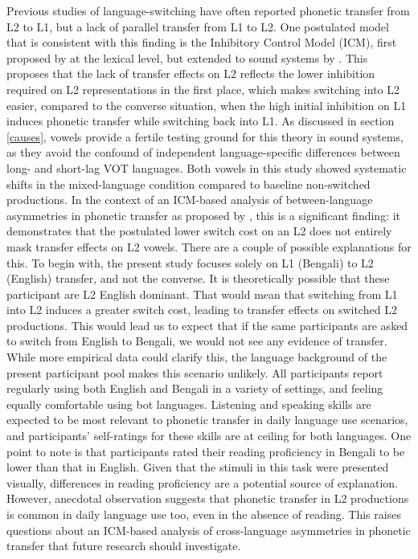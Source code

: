 \documentclass[12 pt]{article}
\begin{document}
Previous studies of language-switching have often reported phonetic transfer from L2 to L1, but a lack of parallel transfer from L1 to L2. One postulated model that is consistent with this finding is the Inhibitory Control Model (ICM), first proposed by \cite{green1986control} at the lexical level, but extended to sound systems by \cite{olson2013bilingual,tsui2019impact}. This proposes that the lack of transfer effects on L2 reflects the lower inhibition required on L2 representations in the first place, which makes switching into L2 easier, compared to the converse situation, when the high initial inhibition on L1 induces phonetic transfer while switching back into L1.  As discussed in section \ref{causes}, vowels provide a fertile testing ground for this theory in sound systems, as they avoid the confound of independent language-specific differences between long- and short-lag VOT languages. Both vowels in this study showed systematic shifts in the mixed-language condition compared to baseline non-switched productions. In the context of an ICM-based analysis of between-language asymmetries in phonetic transfer as proposed by \cite{olson2013bilingual}, this is a significant finding: it demonstrates that the postulated lower switch cost on an L2 does not entirely mask transfer effects on L2 vowels. There are a couple of possible explanations for this. To begin with, the present study focuses solely on L1 (Bengali) to L2 (English) transfer, and not the converse. It is theoretically possible that these participant are L2 English dominant. That would mean that switching from L1 into L2 induces a greater switch cost, leading to transfer effects on switched L2 productions. This would lead us to expect that if the same participants are asked to switch from English to Bengali, we would not see any evidence of transfer. While more empirical data could clarify this, the language background of the present participant pool makes this scenario unlikely. All participants report regularly using both English and Bengali in a variety of settings, and feeling equally comfortable using bot languages. Listening and speaking skills are expected to be most relevant to phonetic transfer in daily language use scenarios, and participants' self-ratings for these skills are at ceiling for both languages. One point to note is that participants rated their reading proficiency in Bengali to be lower than that in English. Given that the stimuli in this task were presented visually, differences in reading proficiency are a potential source of explanation. However, anecdotal observation suggests that phonetic transfer in L2 productions is common in daily language use too, even in the absence of reading. This raises questions about an ICM-based analysis of cross-language asymmetries in phonetic transfer that future research should investigate.
\end{document}
